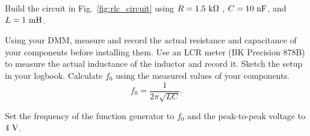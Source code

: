%


%


\noindent Build the circuit in Fig.~\ref{fig:rlc_circuit} using $R=1.5~{\rm k \Omega}$ ,
$C=10~\rm{n F}$, and $L=1~\rm mH$. 
\begin{measurement} Using your DMM, measure and record
the actual resistance and capacitance of your components before
installing them. Use an LCR meter (BK Precision 878B)  to measure the actual inductance of the inductor and record it. Sketch the setup in your logbook.
Calculate $f_0$ using the measured values of your components. 
\begin{equation}
f_0 = \frac{1}{2\pi \sqrt{LC}}. 
\end{equation}
\end{measurement} 

\noindent Set the frequency of the function generator to $f_0$ and the peak-to-peak
voltage to $4~\rm V$.

